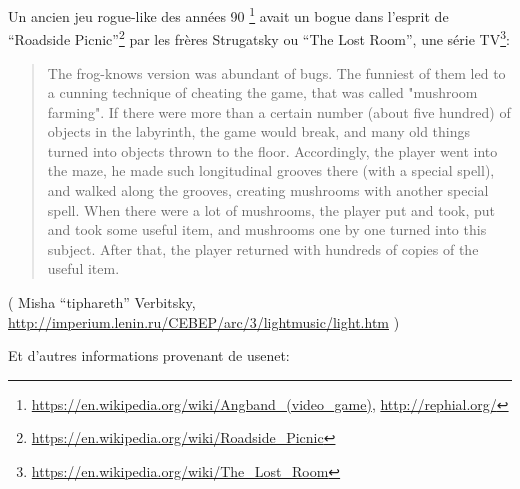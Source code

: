 \label{Angband}

Un ancien jeu rogue-like des années 90
\footnote{\url{https://en.wikipedia.org/wiki/Angband_(video_game)}, \url{http://rephial.org/}}
avait un bogue dans l'esprit de ``Roadside Picnic''\footnote{\url{https://en.wikipedia.org/wiki/Roadside_Picnic}}
par les frères Strugatsky ou ``The Lost Room'', une série TV\footnote{\url{https://en.wikipedia.org/wiki/The_Lost_Room}}:

\begin{framed}
\begin{quotation}
The frog-knows version was abundant of bugs.
The funniest of them led to a cunning technique of cheating the game, that was called "mushroom farming".
If there were more than a certain number (about five hundred) of objects in the labyrinth, the game would break,
and many old things turned into objects thrown to the floor. Accordingly, the player went into the maze,
he made such longitudinal grooves there (with a special spell), and walked along the grooves,
creating mushrooms with another special spell.
When there were a lot of mushrooms, the player put and took, put and took some useful item,
and mushrooms one by one turned into this subject.
After that, the player returned with hundreds of copies of the useful item.
\end{quotation}
\end{framed}
( Misha ``tiphareth'' Verbitsky, \url{http://imperium.lenin.ru/CEBEP/arc/3/lightmusic/light.htm} )

Et d'autres informations provenant de usenet:

